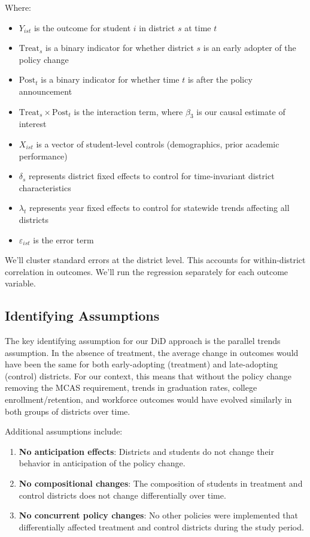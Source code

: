 \documentclass[12pt]{article}
\begin{document}
Where:
\begin{itemize}
    \item $Y_{ist}$ is the outcome for student $i$ in district $s$ at time $t$
    \item $\text{Treat}_s$ is a binary indicator for whether district $s$ is an early adopter of the policy change
    \item $\text{Post}_t$ is a binary indicator for whether time $t$ is after the policy announcement
    \item $\text{Treat}_s \times \text{Post}_t$ is the interaction term, where $\beta_3$ is our causal estimate of interest
    \item $X_{ist}$ is a vector of student-level controls (demographics, prior academic performance)
    \item $\delta_s$ represents district fixed effects to control for time-invariant district characteristics
    \item $\lambda_t$ represents year fixed effects to control for statewide trends affecting all districts
    \item $\varepsilon_{ist}$ is the error term
\end{itemize}

We'll cluster standard errors at the district level. This accounts for within-district correlation in outcomes. We'll run the regression separately for each outcome variable.

\subsection{Identifying Assumptions}

The key identifying assumption for our DiD approach is the parallel trends assumption. In the absence of treatment, the average change in outcomes would have been the same for both early-adopting (treatment) and late-adopting (control) districts. For our context, this means that without the policy change removing the MCAS requirement, trends in graduation rates, college enrollment/retention, and workforce outcomes would have evolved similarly in both groups of districts over time.

Additional assumptions include:

\begin{enumerate}
    \item \textbf{No anticipation effects}: Districts and students do not change their behavior in anticipation of the policy change.

    \item \textbf{No compositional changes}: The composition of students in treatment and control districts does not change differentially over time.

    \item \textbf{No concurrent policy changes}: No other policies were implemented that differentially affected treatment and control districts during the study period.
\end{enumerate}
\end{document}
